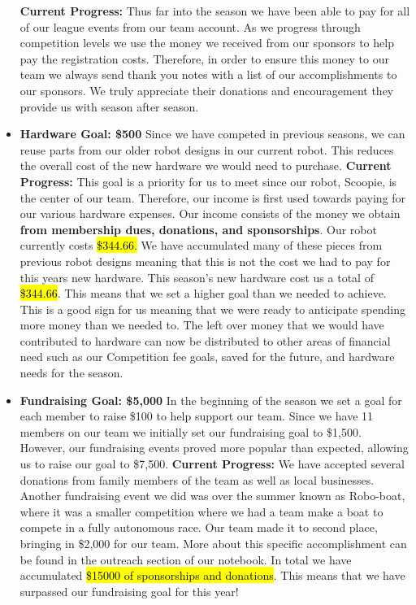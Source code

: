 \begin{itemize}
  \textbf{Current Progress: }
 	Thus far into the season we have been able to pay for all of our league events from our team account. As we progress through competition levels we use the money we received from our sponsors to help pay the registration costs. Therefore, in order to ensure this money to our team we always send thank you notes with a list of our accomplishments to our sponsors. We truly appreciate their donations and encouragement they provide us with season after season. 
  \item \textbf{\Large Hardware Goal: \$500 }
  \newline 
  Since we have competed in previous seasons, we can reuse parts from our older robot designs in our current robot. This reduces the overall cost of the new hardware we would need to purchase. 
  \newline
  \textbf{Current Progress: }
  This goal is a priority for us to meet since our robot, Scoopie, is the center of our team. Therefore, our income is first used towards paying for our various hardware expenses. Our income consists of the money we obtain \textbf{from membership dues, donations, and sponsorships}. Our robot currently costs \hl{\$344.66.} We have accumulated many of these pieces from previous robot designs meaning that this is not the cost we had to pay for this years new hardware. This season's new hardware cost us a total of \hl{\$344.66}. This means that we set a higher goal than we needed to achieve. This is a good sign for us meaning that we were ready to anticipate spending more money than we needed to. The left over money that we would have contributed to hardware can now be distributed to other areas of financial need such as our Competition fee goals, saved for the future, and hardware needs for the season.
  \item \textbf{\Large Fundraising Goal: \$5,000 }
  \newline 
In the beginning of the season we set a goal for each member to raise \$100 to help support our team. Since we have 11 members on our team we initially set our fundraising goal to \$1,500. However, our fundraising events proved more popular than expected, allowing us to raise our goal to \$7,500.
  \newline 
  \textbf{Current Progress: }We have accepted several donations from family members of the team as well as local businesses. Another fundraising event we did was over the summer known as Robo-boat, where it was a smaller competition where we had a team make a boat to compete in a fully autonomous race. Our team made it to second place, bringing in \$2,000 for our team. More about this specific accomplishment can be found in the outreach section of our notebook. In total we have accumulated \hl{\$15000 of sponsorships and donations}. This means that we have surpassed our fundraising goal for this year!
  
\end{itemize}

